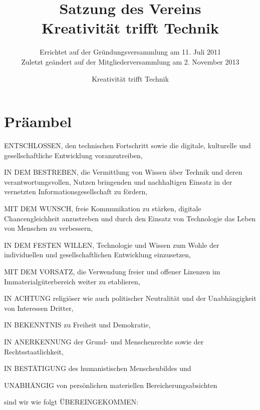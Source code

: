 \documentclass[a4paper,10pt]{scrreprt}
\begin{document}
\title{Satzung des Vereins\\Kreativität trifft Technik}
\subtitle{
	Errichtet auf der Gründungsversammlung am 11. Juli 2011\\
	Zuletzt geändert auf der Mitgliederversammlung am 2. November 2013
}
\author{Kreativität trifft Technik}



\section*{Präambel}

ENTSCHLOSSEN, den technischen Fortschritt sowie die digitale, kulturelle und
gesellschaftliche Entwicklung voranzutreiben,

IN DEM BESTREBEN, die Vermittlung von Wissen über Technik und deren
verantwortungsvollen, Nutzen bringenden und nachhaltigen Einsatz in der
vernetzten Informationsgesellschaft zu fördern,

MIT DEM WUNSCH, freie Kommunikation zu stärken, digitale Chancengleichheit
anzustreben und durch den Einsatz von Technologie das Leben von Menschen zu
verbessern,

IN DEM FESTEN WILLEN, Technologie und Wissen zum Wohle der individuellen und
gesellschaftlichen Entwicklung einzusetzen,

MIT DEM VORSATZ, die Verwendung freier und offener Lizenzen im
Immaterialgüterbereich weiter zu etablieren,

IN ACHTUNG religiöser wie auch politischer Neutralität und der Unabhängigkeit
von Interessen Dritter,

IN BEKENNTNIS zu Freiheit und Demokratie,

IN ANERKENNUNG der Grund- und Menschenrechte sowie der Rechtsstaatlichkeit,

IN BESTÄTIGUNG des humanistischen Menschenbildes und

UNABHÄNGIG von persönlichen materiellen Bereicherungsabsichten

sind wir wie folgt ÜBEREINGEKOMMEN:

\newpage
\end{document}
